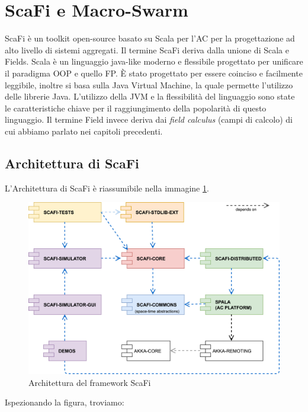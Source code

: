 \documentclass[12pt,a4paper,openright,twoside]{book}
\begin{document}
\section{ScaFi e Macro-Swarm}

ScaFi è un toolkit open-source basato su Scala per l'\ac{AC} per la progettazione ad alto livello di sistemi aggregati.
Il termine ScaFi deriva dalla unione di Scala e Fields. Scala è un linguaggio java-like moderno e flessibile progettato per unificare il paradigma \ac{OOP} e quello \ac{FP}. È stato progettato per essere coinciso e facilmente leggibile, inoltre si basa sulla Java Virtual Machine, la quale permette l'utilizzo delle librerie Java. L'utilizzo della JVM e la flessibilità del linguaggio sono state le caratteristiche chiave per il raggiungimento della popolarità di questo linguaggio. Il termine Field invece deriva dai \textit{field calculus} (campi di calcolo) di cui abbiamo parlato nei capitoli precedenti.

\subsection{Architettura di ScaFi}

L'Architettura di ScaFi è riassumibile nella immagine \cref{fig:scafi-arc}.

\begin{figure}
    \centering
    \includegraphics[width=.8\linewidth]{figures/scafi-arc.jpg}
    \caption{Architettura del framework ScaFi}
    \label{fig:scafi-arc}
\end{figure}

Ispezionando la figura, troviamo:
\end{document}
